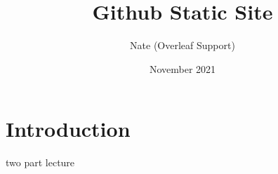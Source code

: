 \documentclass{article}
\title{Github Static Site}
\author{Nate (Overleaf Support)}
\date{November 2021}
\begin{document}
\maketitle

\section{Introduction}

two part lecture
\end{document}

